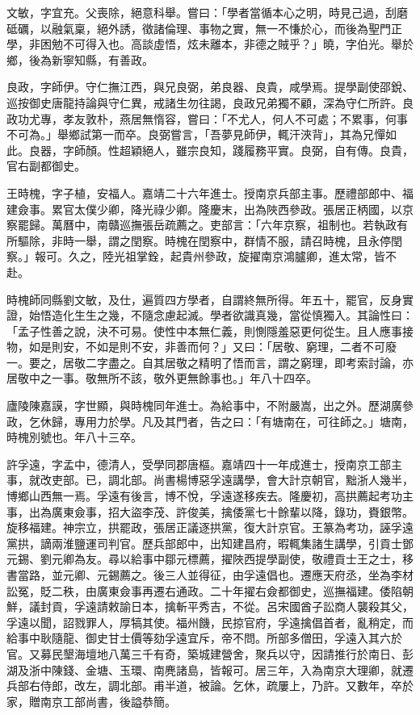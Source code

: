 \begin{pinyinscope}
文敏，字宜充。父喪除，絕意科舉。嘗曰：「學者當循本心之明，時見己過，刮磨砥礪，以融氣稟，絕外誘，徵諸倫理、事物之實，無一不慊於心，而後為聖門正學，非困勉不可得入也。高談虛悟，炫未離本，非德之賊乎？」曉，字伯光。舉於鄉，後為新寧知縣，有善政。

良政，字師伊。守仁撫江西，與兄良弼，弟良器、良貴，咸學焉。提學副使邵銳、巡按御史唐龍持論與守仁異，戒諸生勿往謁，良政兄弟獨不顧，深為守仁所許。良政功尤專，孝友敦朴，燕居無惰容，嘗曰：「不尤人，何人不可處；不累事，何事不可為。」舉鄉試第一而卒。良弼嘗言，「吾夢見師伊，輒汗浹背」，其為兄憚如此。良器，字師顏。性超穎絕人，雖宗良知，踐履務平實。良弼，自有傳。良貴，官右副都御史。

王時槐，字子植，安福人。嘉靖二十六年進士。授南京兵部主事。歷禮部郎中、福建僉事。累官太僕少卿，降光祿少卿。隆慶末，出為陜西參政。張居正柄國，以京察罷歸。萬曆中，南贛巡撫張岳疏薦之。吏部言：「六年京察，祖制也。若執政有所驅除，非時一舉，謂之閏察。時槐在閏察中，群情不服，請召時槐，且永停閏察。」報可。久之，陸光祖掌銓，起貴州參政，旋擢南京鴻臚卿，進太常，皆不赴。

時槐師同縣劉文敏，及仕，遍質四方學者，自謂終無所得。年五十，罷官，反身實證，始悟造化生生之幾，不隨念慮起滅。學者欲識真幾，當從慎獨入。其論性曰：「孟子性善之說，決不可易。使性中本無仁義，則惻隱羞惡更何從生。且人應事接物，如是則安，不如是則不安，非善而何？」又曰：「居敬、窮理，二者不可廢一。要之，居敬二字盡之。自其居敬之精明了悟而言，謂之窮理，即考索討論，亦居敬中之一事。敬無所不該，敬外更無餘事也。」年八十四卒。

廬陵陳嘉謨，字世顯，與時槐同年進士。為給事中，不附嚴嵩，出之外。歷湖廣參政，乞休歸，專用力於學。凡及其門者，告之曰：「有塘南在，可往師之。」塘南，時槐別號也。年八十三卒。

許孚遠，字孟中，德清人，受學同郡唐樞。嘉靖四十一年成進士，授南京工部主事，就改吏部。已，調北部。尚書楊博惡孚遠講學，會大計京朝官，黜浙人幾半，博鄉山西無一焉。孚遠有後言，博不悅，孚遠遂移疾去。隆慶初，高拱薦起考功主事，出為廣東僉事，招大盜李茂、許俊美，擒倭黨七十餘輩以降，錄功，賚銀幣。旋移福建。神宗立，拱罷政，張居正議逐拱黨，復大計京官。王篆為考功，誣孚遠黨拱，謫兩淮鹽運司判官。歷兵部郎中，出知建昌府，暇輒集諸生講學，引貢士鄧元錫、劉元卿為友。尋以給事中鄒元標薦，擢陜西提學副使，敬禮貢士王之士，移書當路，並元卿、元錫薦之。後三人並得征，由孚遠倡也。遷應天府丞，坐為李材訟冤，貶二秩，由廣東僉事再遷右通政。二十年擢右僉都御史，巡撫福建。倭陷朝鮮，議封貢，孚遠請敕諭日本，擒斬平秀吉，不從。呂宋國酋子訟商人襲殺其父，孚遠以聞，詔戮罪人，厚犒其使。福州饑，民掠官府，孚遠擒倡首者，亂稍定，而給事中耿隨龍、御史甘士價等劾孚遠宜斥，帝不問。所部多僧田，孚遠入其六於官。又募民墾海壇地八萬三千有奇，築城建營舍，聚兵以守，因請推行於南日、彭湖及浙中陳錢、金塘、玉環、南麂諸島，皆報可。居三年，入為南京大理卿，就遷兵部右侍郎，改左，調北部。甫半道，被論。乞休，疏屢上，乃許。又數年，卒於家，贈南京工部尚書，後謚恭簡。


\end{pinyinscope}
